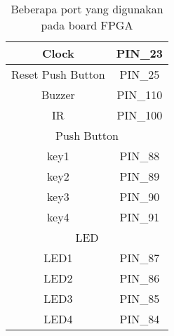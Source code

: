 \begin{table}[H]
\caption{Beberapa port yang digunakan pada board FPGA}\label{tab:pin}
\centering
\begin{tabular}{|c|c|}
\hline 
Clock & PIN\_23\\
\hline 
Reset Push Button & PIN\_25\\
\hline 
Buzzer & PIN\_110 \\
\hline
IR & PIN\_100 \\
\hline 
\multicolumn{2}{|c|}{Push Button}\\
\hline 
key1 & PIN\_88 \\
\hline 
key2 & PIN\_89 \\
\hline 
key3 & PIN\_90 \\
\hline 
key4 & PIN\_91 \\
\hline 
\multicolumn{2}{|c|}{LED} \\
\hline 
LED1 & PIN\_87 \\
\hline 
LED2 & PIN\_86 \\
\hline 
LED3 & PIN\_85 \\
\hline 
LED4 & PIN\_84 \\
\hline 
\end{tabular}
\par
\end{table}

